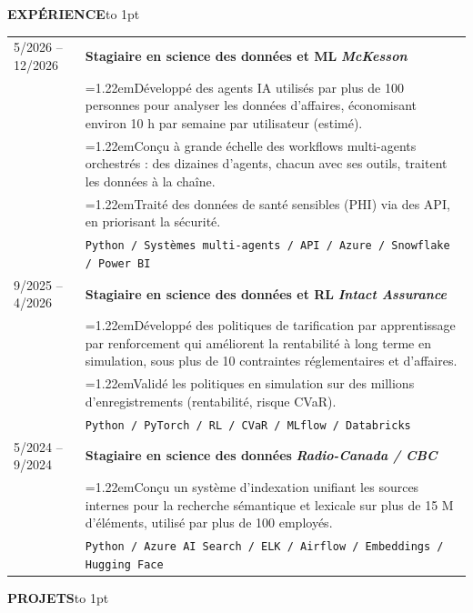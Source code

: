 \documentclass[a4paper,10pt]{article}
\newcommand{\sechead}[1]{\vspace{0.4em}\noindent\textbf{\large #1}\hspace{0.8em}\leaders\hbox to 1pt{\hss\raisebox{0.3em}{\rule{1pt}{0.4pt}}\hss}\hfill\null\par\vspace{0.45em}}
\newcommand{\bul}{\hangindent=1.22em\hangafter=1\hspace{0.5em}\textbullet\hspace{0.4em}}
\begin{document}
    \vspace{0.2em}
    \sechead{EXPÉRIENCE}
    
    \begin{tabularx}{\textwidth}{@{}p{3cm} X@{}}
        5/2026 -- 12/2026 & 
        \textbf{Stagiaire en science des données et ML} \hfill \textbf{\textit{McKesson}}\\[0.2em]
        & \bul Développé des agents IA utilisés par plus de 100 personnes pour analyser les données d’affaires, économisant environ 10 h par semaine par utilisateur (estimé). \\
        & \bul Conçu à grande échelle des workflows multi-agents orchestrés : des dizaines d’agents, chacun avec ses outils, traitent les données à la chaîne. \\
        & \bul Traité des données de santé sensibles (PHI) via des API, en priorisant la sécurité. \\
        & \texttt{Python / Systèmes multi-agents / API / Azure / Snowflake / Power BI} \\[0.3em]

        9/2025 -- 4/2026 & 
        \textbf{Stagiaire en science des données et RL} \hfill \textbf{\textit{Intact Assurance}}\\[0.2em]
        & \bul Développé des politiques de tarification par apprentissage par renforcement qui améliorent la rentabilité à long terme en simulation, sous plus de 10 contraintes réglementaires et d’affaires.\\
        & \bul Validé les politiques en simulation sur des millions d’enregistrements (rentabilité, risque CVaR).\\
        & \texttt{Python / PyTorch / RL / CVaR / MLflow / Databricks} \\[0.3em]
        
        5/2024 -- 9/2024 & 
        \textbf{Stagiaire en science des données} \hfill \textbf{\textit{Radio-Canada / CBC}}\\[0.2em]
       & \bul Conçu un système d’indexation unifiant les sources internes pour la recherche sémantique et lexicale sur plus de 15 M d’éléments, utilisé par plus de 100 employés. \\
        & \texttt{Python / Azure AI Search / ELK / Airflow / Embeddings / Hugging Face} \\[0.3em]
    \end{tabularx}
    
    \vspace{0.2em}
    \sechead{PROJETS}
    
\end{document}
